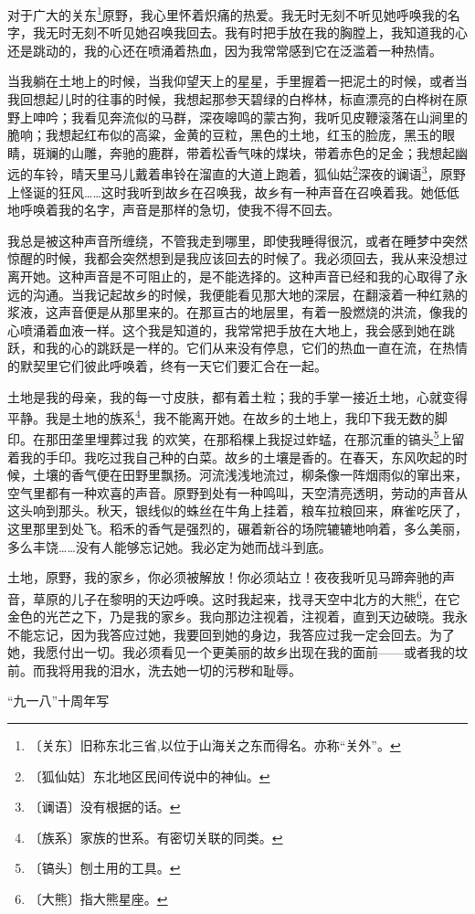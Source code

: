 \documentclass[12pt,UTF-8,openany]{ctexbook}
\begin{document}
\begin{normalsize}
    
    对于广大的关东\footnote{〔关东〕旧称东北三省,以位于山海关之东而得名。亦称“关外”。}原野，我心里怀着炽痛的热爱。我无时无刻不听见她呼唤我的名字，我无时无刻不听见她召唤我回去。我有时把手放在我的胸膛上，我知道我的心还是跳动的，我的心还在喷涌着热血，因为我常常感到它在泛滥着一种热情。
    
    当我躺在土地上的时候，当我仰望天上的星星，手里握着一把泥土的时候，或者当我回想起儿时的往事的时候，我想起那参天碧绿的白桦林，标直漂亮的白桦树在原野上呻吟；我看见奔流似的马群，深夜嗥鸣的蒙古狗，我听见皮鞭滚落在山涧里的脆响；我想起红布似的高粱，金黄的豆粒，黑色的土地，红玉的脸庞，黑玉的眼睛，斑斓的山雕，奔驰的鹿群，带着松香气味的煤块，带着赤色的足金；我想起幽远的车铃，晴天里马儿戴着串铃在溜直的大道上跑着，狐仙姑\footnote{〔狐仙姑〕东北地区民间传说中的神仙。}深夜的谰语\footnote{〔谰语〕没有根据的话。}，原野上怪诞的狂风……这时我听到故乡在召唤我，故乡有一种声音在召唤着我。她低低地呼唤着我的名字，声音是那样的急切，使我不得不回去。
    
    我总是被这种声音所缠绕，不管我走到哪里，即使我睡得很沉，或者在睡梦中突然惊醒的时候，我都会突然想到是我应该回去的时候了。我必须回去，我从来没想过离开她。这种声音是不可阻止的，是不能选择的。这种声音已经和我的心取得了永远的沟通。当我记起故乡的时候，我便能看见那大地的深层，在翻滚着一种红熟的浆液，这声音便是从那里来的。在那亘古的地层里，有着一股燃烧的洪流，像我的心喷涌着血液一样。这个我是知道的，我常常把手放在大地上，我会感到她在跳跃，和我的心的跳跃是一样的。它们从来没有停息，它们的热血一直在流，在热情的默契里它们彼此呼唤着，终有一天它们要汇合在一起。
    
    土地是我的母亲，我的每一寸皮肤，都有着土粒；我的手掌一接近土地，心就变得平静。我是土地的族系\footnote{〔族系〕家族的世系。有密切关联的同类。}，我不能离开她。在故乡的土地上，我印下我无数的脚印。在那田垄里埋葬过我 的欢笑，在那稻棵上我捉过蚱蜢，在那沉重的镐头\footnote{〔镐头〕刨土用的工具。}上留着我的手印。我吃过我自己种的白菜。故乡的土壤是香的。在春天，东风吹起的时候，土壤的香气便在田野里飘扬。河流浅浅地流过，柳条像一阵烟雨似的窜出来，空气里都有一种欢喜的声音。原野到处有一种鸣叫，天空清亮透明，劳动的声音从这头响到那头。秋天，银线似的蛛丝在牛角上挂着，粮车拉粮回来，麻雀吃厌了，这里那里到处飞。稻禾的香气是强烈的，碾着新谷的场院辘辘地响着，多么美丽，多么丰饶……没有人能够忘记她。我必定为她而战斗到底。
    
    土地，原野，我的家乡，你必须被解放！你必须站立！夜夜我听见马蹄奔驰的声音，草原的儿子在黎明的天边呼唤。这时我起来，找寻天空中北方的大熊\footnote{〔大熊〕指大熊星座。}，在它金色的光芒之下，乃是我的家乡。我向那边注视着，注视着，直到天边破晓。我永不能忘记，因为我答应过她，我要回到她的身边，我答应过我一定会回去。为了她，我愿付出一切。我必须看见一个更美丽的故乡出现在我的面前——或者我的坟前。而我将用我的泪水，洗去她一切的污秽和耻辱。
    
    \hfill “九一八”十周年写
    
\end{normalsize}
\end{document}
